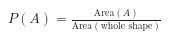 \documentclass[preview]{standalone}
\begin{document}
\begin{align*}
P(A) = \frac{\text{Area}(A)}{\text{Area}(\text{whole shape})}
\end{align*}
\end{document}
